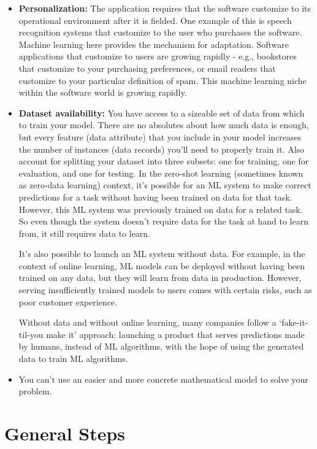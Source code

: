 \documentclass[openany]{book}
\begin{document}
\begin{itemize}
    \item \textbf{Personalization:} The application requires that the software customize to its operational environment after it is fielded. One example of this is speech recognition systems that customize to the user who purchases the software. Machine learning here provides the mechanism for adaptation. Software applications that customize to users are growing rapidly - e.g., bookstores that customize to your purchasing preferences, or email readers that customize to your particular definition of spam. This machine learning niche within the software world is growing rapidly.

    \item \textbf{Dataset availability:} You have access to a sizeable set of data from which to train your model. There are no absolutes about how much data is enough, but every feature (data attribute) that you include in your model increases the number of instances (data records) you'll need to properly train it. Also account for splitting your dataset into three subsets: one for training, one for evaluation, and one for testing. In the zero-shot learning (sometimes known as zero-data learning) context, it’s possible for an ML system to make correct predictions for a task without having been trained on data for that task. However, this ML system was previously trained on data for a related task. So even though the system doesn’t require data for the task at hand to learn from, it still requires data to learn.
    
    It’s also possible to launch an ML system without data. For example, in the context of online learning, ML models can be deployed without having been trained on any data, but they will learn from data in production. However, serving insufficiently trained models to users comes with certain risks, such as poor customer experience.
    
    Without data and without online learning, many companies follow a ‘fake-it-til-you make it’ approach: launching a product that serves predictions made by humans, instead of ML algorithms, with the hope of using the generated data to train ML algorithms.


    \item You can't use an easier and more concrete mathematical model to solve your problem.
 
\end{itemize}


\section{General Steps}
\end{document}
